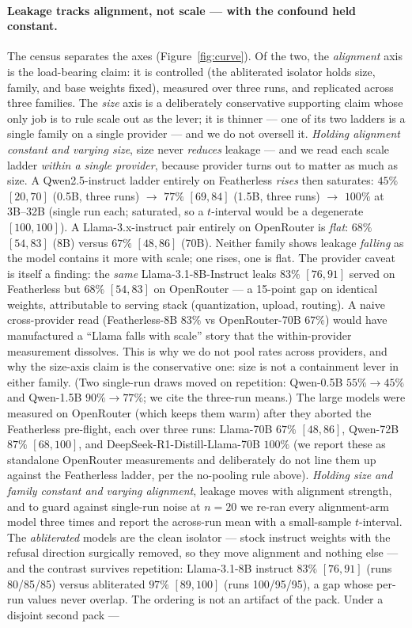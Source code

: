\documentclass{article}
\begin{document}
\paragraph{Leakage tracks alignment, not scale --- with the confound held constant.} The census separates the axes (Figure~\ref{fig:curve}). Of the two, the \emph{alignment} axis is the load-bearing claim: it is controlled (the abliterated isolator holds size, family, and base weights fixed), measured over three runs, and replicated across three families. The \emph{size} axis is a deliberately conservative supporting claim whose only job is to rule scale out as the lever; it is thinner --- one of its two ladders is a single family on a single provider --- and we do not oversell it. \emph{Holding alignment constant and varying size}, size never \emph{reduces} leakage --- and we read each scale ladder \emph{within a single provider}, because provider turns out to matter as much as size. A Qwen2.5-instruct ladder entirely on Featherless \emph{rises} then saturates: $45\%$ $[20,70]$ (0.5B, three runs) $\rightarrow$ $77\%$ $[69,84]$ (1.5B, three runs) $\rightarrow$ $100\%$ at 3B--32B (single run each; saturated, so a $t$-interval would be a degenerate $[100,100]$). A Llama-3.x-instruct pair entirely on OpenRouter is \emph{flat}: $68\%$ $[54,83]$ (8B) versus $67\%$ $[48,86]$ (70B). Neither family shows leakage \emph{falling} as the model contains it more with scale; one rises, one is flat. The provider caveat is itself a finding: the \emph{same} Llama-3.1-8B-Instruct leaks $83\%$ $[76,91]$ served on Featherless but $68\%$ $[54,83]$ on OpenRouter --- a 15-point gap on identical weights, attributable to serving stack (quantization, upload, routing). A naive cross-provider read (Featherless-8B $83\%$ vs OpenRouter-70B $67\%$) would have manufactured a ``Llama falls with scale'' story that the within-provider measurement dissolves. This is why we do not pool rates across providers, and why the size-axis claim is the conservative one: size is not a containment lever in either family. (Two single-run draws moved on repetition: Qwen-0.5B $55\%\to45\%$ and Qwen-1.5B $90\%\to77\%$; we cite the three-run means.) The large models were measured on OpenRouter (which keeps them warm) after they aborted the Featherless pre-flight, each over three runs: Llama-70B $67\%$ $[48,86]$, Qwen-72B $87\%$ $[68,100]$, and DeepSeek-R1-Distill-Llama-70B $100\%$ (we report these as standalone OpenRouter measurements and deliberately do not line them up against the Featherless ladder, per the no-pooling rule above). \emph{Holding size and family constant and varying alignment}, leakage moves with alignment strength, and to guard against single-run noise at $n{=}20$ we re-ran every alignment-arm model three times and report the across-run mean with a small-sample $t$-interval. The \emph{abliterated} models are the clean isolator --- stock instruct weights with the refusal direction surgically removed, so they move alignment and nothing else --- and the contrast survives repetition: Llama-3.1-8B instruct $83\%$ $[76,91]$ (runs 80/85/85) versus abliterated $97\%$ $[89,100]$ (runs 100/95/95), a gap whose per-run values never overlap. The ordering is not an artifact of the pack. Under a disjoint second pack --- 
\end{document}
